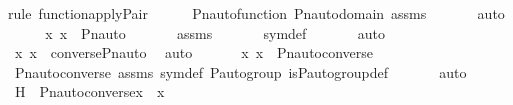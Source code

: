 \begin{isabellebody}
{\isacharparenleft}{\kern0pt}rule\ function{\isacharunderscore}{\kern0pt}apply{\isacharunderscore}{\kern0pt}Pair{\isacharparenright}{\kern0pt}\isanewline
\ \ \ \ \isamarkupfalse%
\ Pn{\isacharunderscore}{\kern0pt}auto{\isacharunderscore}{\kern0pt}function\ Pn{\isacharunderscore}{\kern0pt}auto{\isacharunderscore}{\kern0pt}domain\ assms\ \isanewline
\ \ \ \ \isamarkupfalse%
\ auto\ \isanewline
\ \ \isamarkupfalse%
\ \isamarkupfalse%
\ {\isachardoublequoteopen}{\isacharless}{\kern0pt}x{\isacharcomma}{\kern0pt}\ x{\isachargreater}{\kern0pt}\ {\isasymin}\ Pn{\isacharunderscore}{\kern0pt}auto{\isacharparenleft}{\kern0pt}{\isasympi}{\isacharparenright}{\kern0pt}{\isachardoublequoteclose}\ \isanewline
\ \ \ \ \isamarkupfalse%
\ assms\ \isanewline
\ \ \ \ \isamarkupfalse%
\ sym{\isacharunderscore}{\kern0pt}def\ \isanewline
\ \ \ \ \isamarkupfalse%
\ auto\isanewline
\ \ \isamarkupfalse%
\ \isamarkupfalse%
\ {\isachardoublequoteopen}{\isacharless}{\kern0pt}x{\isacharcomma}{\kern0pt}\ x{\isachargreater}{\kern0pt}\ {\isasymin}\ converse{\isacharparenleft}{\kern0pt}Pn{\isacharunderscore}{\kern0pt}auto{\isacharparenleft}{\kern0pt}{\isasympi}{\isacharparenright}{\kern0pt}{\isacharparenright}{\kern0pt}{\isachardoublequoteclose}\ \isamarkupfalse%
\ auto\ \isanewline
\ \ \isamarkupfalse%
\ \isamarkupfalse%
\ {\isachardoublequoteopen}{\isacharless}{\kern0pt}x{\isacharcomma}{\kern0pt}\ x{\isachargreater}{\kern0pt}\ {\isasymin}\ Pn{\isacharunderscore}{\kern0pt}auto{\isacharparenleft}{\kern0pt}converse{\isacharparenleft}{\kern0pt}{\isasympi}{\isacharparenright}{\kern0pt}{\isacharparenright}{\kern0pt}{\isachardoublequoteclose}\ \isanewline
\ \ \ \ \isamarkupfalse%
\ Pn{\isacharunderscore}{\kern0pt}auto{\isacharunderscore}{\kern0pt}converse\ assms\ sym{\isacharunderscore}{\kern0pt}def\ {\isasymG}{\isacharunderscore}{\kern0pt}P{\isacharunderscore}{\kern0pt}auto{\isacharunderscore}{\kern0pt}group\ is{\isacharunderscore}{\kern0pt}P{\isacharunderscore}{\kern0pt}auto{\isacharunderscore}{\kern0pt}group{\isacharunderscore}{\kern0pt}def\ \isanewline
\ \ \ \ \isamarkupfalse%
\ auto\isanewline
\ \ \isamarkupfalse%
\ \isamarkupfalse%
\ H\ {\isacharcolon}{\kern0pt}\ {\isachardoublequoteopen}Pn{\isacharunderscore}{\kern0pt}auto{\isacharparenleft}{\kern0pt}converse{\isacharparenleft}{\kern0pt}{\isasympi}{\isacharparenright}{\kern0pt}{\isacharparenright}{\kern0pt}{\isacharbackquote}{\kern0pt}x\ {\isacharequal}{\kern0pt}\ x{\isachardoublequoteclose}\ \isanewline

\end{isabellebody}
